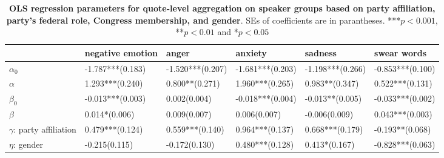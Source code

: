 \begin{table}[h]\centering
\caption{\textbf{OLS regression parameters for quote-level aggregation on speaker groups based on party affiliation, party's federal role, Congress membership, and gender}. SEs of coefficients are in parantheses. ***$p < 0.001$, **$p < 0.01$ and *$p < 0.05$}
	\label{fig: Attributes_3}
\begin{adjustbox}{width=\linewidth, center}
	\begin{tabular}{llllll}
	\toprule
	{} &                                negative emotion &                                                     anger &                                                   anxiety &                                         sadness &                           swear words \\
	\midrule
	$\alpha_0$                     &                                -1.787***(0.183) &                                          -1.520***(0.207) &                                          -1.681***(0.203) &                                -1.198***(0.266) &                      -0.853***(0.100) \\
	$\alpha$                       &                      \phantom{-}1.293***(0.240) &                      \phantom{-}0.800**\phantom{*}(0.271) &                                \phantom{-}1.960***(0.265) &            \phantom{-}0.983**\phantom{*}(0.347) &            \phantom{-}0.522***(0.131) \\
	$\beta_0$                      &                                -0.013***(0.003) &  \phantom{-}0.002\phantom{*}\phantom{*}\phantom{*}(0.004) &                                          -0.018***(0.004) &                      -0.013**\phantom{*}(0.005) &                      -0.033***(0.002) \\
	$\beta$                        &  \phantom{-}0.014*\phantom{*}\phantom{*}(0.006) &  \phantom{-}0.009\phantom{*}\phantom{*}\phantom{*}(0.007) &  \phantom{-}0.006\phantom{*}\phantom{*}\phantom{*}(0.007) &  -0.006\phantom{*}\phantom{*}\phantom{*}(0.009) &            \phantom{-}0.043***(0.003) \\
	$\gamma$: party affiliation    &                      \phantom{-}0.479***(0.124) &                                \phantom{-}0.559***(0.140) &                                \phantom{-}0.964***(0.137) &                      \phantom{-}0.668***(0.179) &            -0.193**\phantom{*}(0.068) \\
	$\eta$: gender                 &  -0.215\phantom{*}\phantom{*}\phantom{*}(0.115) &            -0.172\phantom{*}\phantom{*}\phantom{*}(0.130) &                                \phantom{-}0.480***(0.128) &  \phantom{-}0.413*\phantom{*}\phantom{*}(0.167) &                      -0.828***(0.063) \\

\end{tabular}
\end{adjustbox}
\end{table}
